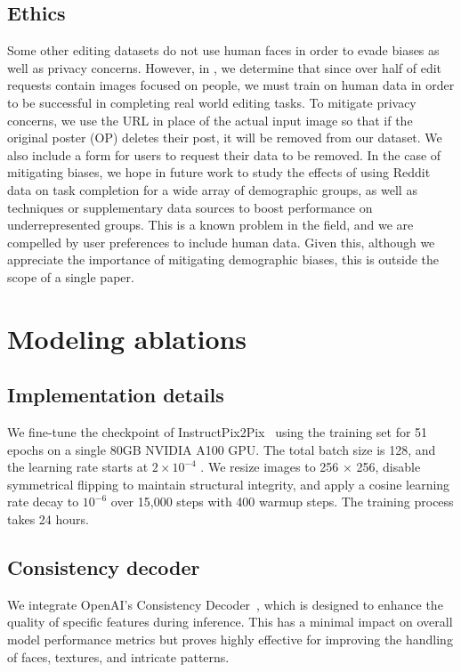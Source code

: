 \subsection{Ethics}
Some other editing datasets \cite{zhang2024magicbrush} do not use human faces in order to evade biases as well as privacy concerns. However, in \ours, we determine that since over half of edit requests contain images focused on people, we must train on human data in order to be successful in completing real world editing tasks. To mitigate privacy concerns, we use the URL in place of the actual input image so that if the original poster (OP) deletes their post, it will be removed from our dataset. We also include a form for users to request their data to be removed. In the case of mitigating biases, we hope in future work to study the effects of using Reddit data on task completion for a wide array of demographic groups, as well as techniques or supplementary data sources to boost performance on underrepresented groups. This is a known problem in the field, and we are compelled by user preferences to include human data. Given this, although we appreciate the importance of mitigating demographic biases, this is outside the scope of a single paper.


\section{Modeling ablations}

\subsection{Implementation details}

We fine-tune the checkpoint of InstructPix2Pix~\cite{brooks2023instructpix2pix} using the \ours training set for 51 epochs on a single 80GB NVIDIA A100 GPU. The total batch size is 128, and the learning rate starts at $2 \times 10^{-4}$
. We resize images to 256 × 256, disable symmetrical flipping to maintain structural integrity, and apply a cosine learning rate decay to $10^{-6}$ over 15,000 steps with 400 warmup steps. The training process takes 24 hours.


\subsection{Consistency decoder}


We integrate OpenAI’s Consistency Decoder~\cite{openai_consistencydecoder}, which is designed to enhance the quality of specific features during inference. This has a minimal impact on overall model performance metrics but proves highly effective for improving the handling of faces, textures, and intricate patterns. 

